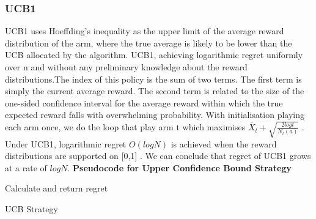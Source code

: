 {    \subsubsection{UCB1}
    UCB1 uses Hoeffding's inequality as the upper limit of the average reward distribution of the arm, where the true average is likely to be lower than the UCB allocated by the algorithm.
    UCB1, achieving logarithmic regret uniformly over n and without any preliminary knowledge about the reward distributions.The index of this policy is the sum of two terms.
    The first term is simply the current average reward.
    The second term is related to the size of the one-sided confidence interval for the average reward within which the true expected reward falls with overwhelming probability.
    With initialisation playing each arm once, we do the loop that play arm t which maximises $\overline X_t + \sqrt{\frac{2log t}{N_t (a)}}$ . \citep{Auer2002}
    \\Under UCB1, logarithmic regret $O(logN)$  is achieved when the reward distributions are supported on [0,1] \citep{Chan_2020}.
    We can conclude that regret of UCB1 grows at a rate of $log N$.
    \newline
    \textbf{Pseudocode for Upper Confidence Bound Strategy}
    \newline
    \begin{algorithm}[H]
        Calculate and return regret
        \caption{UCB Strategy}\label{alg:ucb_algorithm}
    \end{algorithm}

}
